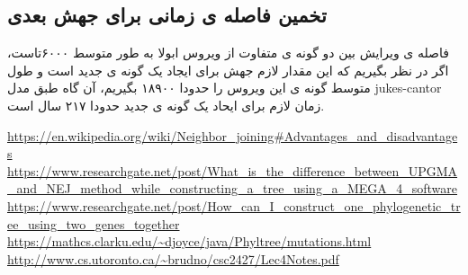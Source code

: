 \documentclass[11pt, oneside]{article}
\begin{document}
\subsection*{تخمین فاصله ی زمانی برای جهش بعدی}
فاصله ی ویرایش بین دو گونه ی متفاوت از ویروس ابولا به طور متوسط ۶۰۰۰تاست، اگر در نظر بگیریم که این مقدار لازم جهش برای ایجاد یک گونه ی جدید است و طول متوسط گونه ی این ویروس را حدودا ۱۸۹۰۰ بگیریم، آن گاه طبق مدل jukes-cantor زمان لازم برای ایحاد یک گونه ی جدید حدودا ۲۱۷ سال است.
\begin{thebibliography}{1}
\begin{latin}

   {\url{https://en.wikipedia.org/wiki/Neighbor_joining#Advantages_and_disadvantages}}
   {\url{https://www.researchgate.net/post/What_is_the_difference_between_UPGMA_and_NEJ_method_while_constructing_a_tree_using_a_MEGA_4_software}}
   {\url{https://www.researchgate.net/post/How_can_I_construct_one_phylogenetic_tree_using_two_genes_together}}  
   {\url{https://mathcs.clarku.edu/~djoyce/java/Phyltree/mutations.html}}  
   {\url{http://www.cs.utoronto.ca/~brudno/csc2427/Lec4Notes.pdf}}  
\end{latin}
\end{thebibliography}
\end{document}
